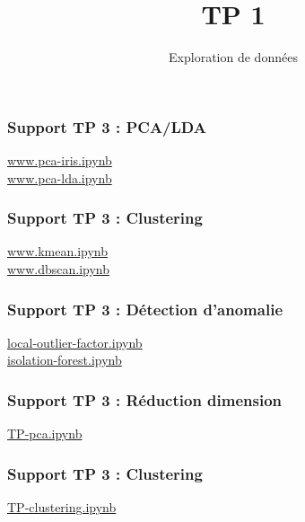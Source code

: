 \documentclass{formation}
\title{TP 1}
\subtitle{Exploration de données}
\begin{document}
\maketitle
    
    
\begin{frame}
  \frametitle{Support TP 3 : PCA/LDA}
  \begin{center}
    \href{https://drive.google.com/open?id=1n_97rd-P5Vo96QG5gFmbqqG1gRcxsehT}{www.pca-iris.ipynb}\\
    \href{https://drive.google.com/open?id=1ctaJCxSC-V94vJMJHsYsfoFag0sKQKiy}{www.pca-lda.ipynb}
  \end{center}
\end{frame}

\begin{frame}
  \frametitle{Support TP 3 : Clustering}
  \begin{center}
    \href{https://drive.google.com/open?id=1-WLPr0rs_h2lf7kvUYJnGAEmwrt86rnE}{www.kmean.ipynb}\\
    \href{https://drive.google.com/open?id=1ENdoGQdU5nHo6_2O6Ip9Qz3hAlsfW3c4}{www.dbscan.ipynb}
  \end{center}
\end{frame}

\begin{frame}
  \frametitle{Support TP 3 : Détection d'anomalie}
  \begin{center}
    \href{https://drive.google.com/open?id=1-nbjcb5JCVDyDDK6DFsVpfBEKcD34X_C}{local-outlier-factor.ipynb}\\
    \href{https://drive.google.com/open?id=1EsUmo2brFdXJ1I2WVEopt3fK2y1jTYE2}{isolation-forest.ipynb}
  \end{center}
\end{frame}

\begin{frame}
  \frametitle{Support TP 3 : Réduction dimension}
  \begin{center}
    \href{https://colab.research.google.com/drive/1IidWHFuR3V0jY47UqY_Xl9qB-eBZ3jj6}{TP-pca.ipynb}
  \end{center}
\end{frame}

\begin{frame}
  \frametitle{Support TP 3 : Clustering}
  \begin{center}
    \href{https://colab.research.google.com/drive/1lhwD8OXXvqy_8wOVE6P12uPuLTA0DABS}{TP-clustering.ipynb}
  \end{center}
\end{frame}
\end{document}
